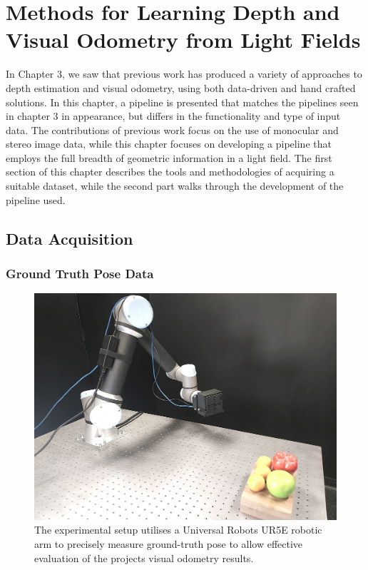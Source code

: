 
\chapter{Methods for Learning Depth and Visual Odometry from Light Fields}

In Chapter 3, we saw that previous work has produced a variety of approaches to depth estimation and visual odometry, using both data-driven and hand crafted solutions. In this chapter, a pipeline is presented that matches the pipelines seen in chapter 3 in appearance, but differs in the functionality and type of input data. The contributions of previous work focus on the use of monocular and stereo image data, while this chapter focuses on developing a pipeline that employs the full breadth of geometric information in a light field. The first section of this chapter describes the tools and methodologies of acquiring a suitable dataset, while the second part walks through the development of the pipeline used.

\section{Data Acquisition}

\subsection{Ground Truth Pose Data}

\begin{figure}[h]
    \centering 
    \includegraphics[width=4.5in]{images/experimentalsetup2.jpg}
    \caption{The experimental setup utilises a Universal Robots UR5E robotic arm to precisely measure ground-truth pose to allow effective evaluation of the projects visual odometry results.}
\end{figure}

